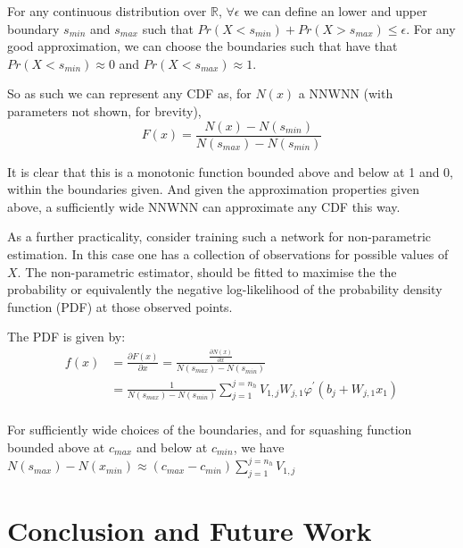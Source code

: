 \documentclass{article} %
\newcommand{\R}{\mathbb{R}}
\begin{document}
For any continuous distribution over $\R$, $\forall \epsilon$ we can define an lower and upper boundary $s_{min}$ and $s_{max}$ such that $Pr(X<s_{min})+Pr(X>s_{max}) \le \epsilon$.
For any good approximation, we can choose the boundaries such that have that $Pr(X<s_{min}) \approx 0$ and $Pr(X<s_{max}) \approx 1$.

So as such we can represent any CDF as,
for $N(x)$ a NNWNN (with parameters not shown, for brevity),
\begin{equation}
	F(x) = \frac{N(x) - N(s_{min})}{N(s_{max})-N(s_{min})}
\end{equation}

It is clear that this is a monotonic function bounded above and below at 1 and 0,
within the boundaries given.
And given the approximation properties given above,
a sufficiently wide NNWNN can approximate any CDF this way.

As a further practicality,
consider training such a network for non-parametric estimation.
In this case one has a collection of observations for possible values of $X$.
The non-parametric estimator, should be fitted to maximise the the probability or equivalently the negative log-likelihood of the probability density function (PDF) at those observed points.

The PDF is given by:
\begin{align}
f(x) &= \frac{\partial F(x)}{\partial x} =\frac{\frac{\partial N(x)}{\partial x}}{N(s_{max})-N(s_{min})} \\
%
&=\frac{1}{N(s_{max})-N(s_{min})} 
\sum_{j=1}^{j=n_h} V_{1,j}W_{j,1} \varphi^\prime (b_j+W_{j,1}x_1) \\
\end{align}

For sufficiently wide choices of the boundaries,
and for squashing function bounded above at $c_{max}$ and below at $c_{min}$,
we have $N(s_{max})-N(x_{min}) \approx (c_{max}-c_{min})\sum_{j=1}^{j=n_h} V_{1,j}$







	
\section{Conclusion and Future Work}



\end{document}

